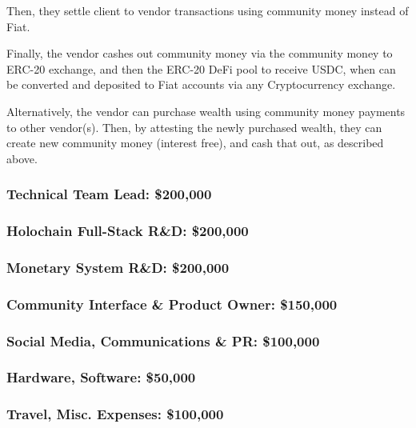 \documentclass[11pt]{article}
\begin{document}
Then, they settle client to vendor transactions using community money instead of Fiat.

Finally, the vendor cashes out community money via the community money to ERC-20 exchange, and
then the ERC-20 DeFi pool to receive USDC, when can be converted and deposited to Fiat accounts
via any Cryptocurrency exchange.

Alternatively, the vendor can purchase wealth using community money payments to other vendor(s).
Then, by attesting the newly purchased wealth, they can create new community money (interest
free), and cash that out, as described above.

\subsubsection{Technical Team Lead: \$200,000}
\label{sec:orgbf1bccf}

\subsubsection{Holochain Full-Stack R\&D: \$200,000}
\label{sec:org65a99e5}

\subsubsection{Monetary System R\&D: \$200,000}
\label{sec:orga9d4d96}

\subsubsection{Community Interface \& Product Owner: \$150,000}
\label{sec:orga19427a}

\subsubsection{Social Media, Communications \& PR: \$100,000}
\label{sec:orgf7a7a5e}

\subsubsection{Hardware, Software: \$50,000}
\label{sec:orgbf6e03a}

\subsubsection{Travel, Misc. Expenses: \$100,000}
\label{sec:orgdec92c4}
\end{document}
